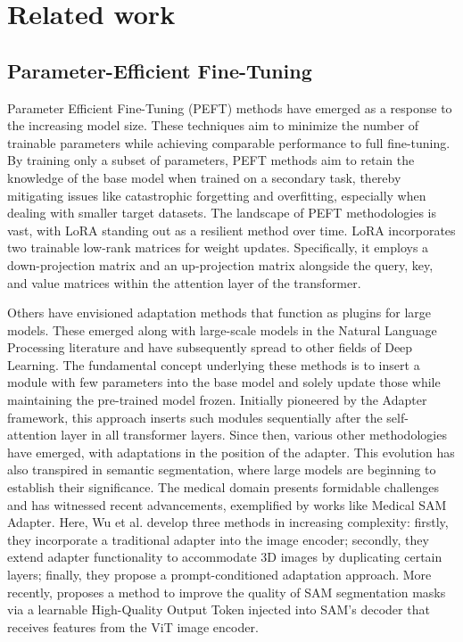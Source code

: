 \section{Related work}
\label{sec:samda_related}
\subsection{Parameter-Efficient Fine-Tuning} 
Parameter Efficient Fine-Tuning (PEFT) methods have emerged as a response to the increasing model size. These techniques aim to minimize the number of trainable parameters while achieving comparable performance to full fine-tuning. By training only a subset of parameters, PEFT methods aim to retain the knowledge of the base model when trained on a secondary task, thereby mitigating issues like catastrophic forgetting and overfitting, especially when dealing with smaller target datasets. The landscape of PEFT methodologies is vast, with LoRA standing out as a resilient method over time. LoRA incorporates two trainable low-rank matrices for weight updates. Specifically, it employs a down-projection matrix and an up-projection matrix alongside the query, key, and value matrices within the attention layer of the transformer.

Others have envisioned adaptation methods that function as plugins for large models. These emerged along with large-scale models in the Natural Language Processing literature and have subsequently spread to other fields of Deep Learning. The fundamental concept underlying these methods is to insert a module with few parameters into the base model and solely update those while maintaining the pre-trained model frozen. Initially pioneered by the Adapter framework, this approach inserts such modules sequentially after the self-attention layer in all transformer layers. Since then, various other methodologies have emerged, with adaptations in the position of the adapter. This evolution has also transpired in semantic segmentation, where large models are beginning to establish their significance. The medical domain presents formidable challenges and has witnessed recent advancements, exemplified by works like Medical SAM Adapter. Here, Wu et al. develop three methods in increasing complexity: firstly, they incorporate a traditional adapter into the image encoder; secondly, they extend adapter functionality to accommodate 3D images by duplicating certain layers; finally, they propose a prompt-conditioned adaptation approach. More recently,  proposes a method to improve the quality of SAM segmentation masks via a learnable High-Quality Output Token injected into SAM's decoder that receives features from the ViT image encoder.

